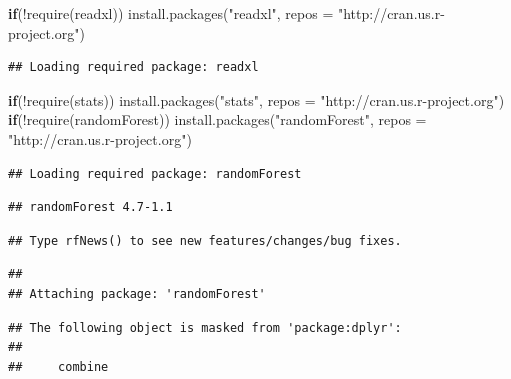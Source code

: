 \documentclass[
]{article}
\newenvironment{Shaded}{}{}
\newcommand{\AttributeTok}[1]{\textcolor[rgb]{0.49,0.56,0.16}{#1}}
\newcommand{\ControlFlowTok}[1]{\textcolor[rgb]{0.00,0.44,0.13}{\textbf{#1}}}
\newcommand{\FunctionTok}[1]{\textcolor[rgb]{0.02,0.16,0.49}{#1}}
\newcommand{\NormalTok}[1]{#1}
\newcommand{\SpecialCharTok}[1]{\textcolor[rgb]{0.25,0.44,0.63}{#1}}
\newcommand{\StringTok}[1]{\textcolor[rgb]{0.25,0.44,0.63}{#1}}
\begin{document}
\begin{Shaded}
\begin{Highlighting}[]
\ControlFlowTok{if}\NormalTok{(}\SpecialCharTok{!}\FunctionTok{require}\NormalTok{(readxl)) }\FunctionTok{install.packages}\NormalTok{(}\StringTok{"readxl"}\NormalTok{, }
                                     \AttributeTok{repos =} \StringTok{"http://cran.us.r{-}project.org"}\NormalTok{)}
\end{Highlighting}
\end{Shaded}

\begin{verbatim}
## Loading required package: readxl
\end{verbatim}

\begin{Shaded}
\begin{Highlighting}[]
\ControlFlowTok{if}\NormalTok{(}\SpecialCharTok{!}\FunctionTok{require}\NormalTok{(stats)) }\FunctionTok{install.packages}\NormalTok{(}\StringTok{"stats"}\NormalTok{, }
                                     \AttributeTok{repos =} \StringTok{"http://cran.us.r{-}project.org"}\NormalTok{)}
\ControlFlowTok{if}\NormalTok{(}\SpecialCharTok{!}\FunctionTok{require}\NormalTok{(randomForest)) }\FunctionTok{install.packages}\NormalTok{(}\StringTok{"randomForest"}\NormalTok{, }
                                     \AttributeTok{repos =} \StringTok{"http://cran.us.r{-}project.org"}\NormalTok{)}
\end{Highlighting}
\end{Shaded}

\begin{verbatim}
## Loading required package: randomForest
\end{verbatim}

\begin{verbatim}
## randomForest 4.7-1.1
\end{verbatim}

\begin{verbatim}
## Type rfNews() to see new features/changes/bug fixes.
\end{verbatim}

\begin{verbatim}
## 
## Attaching package: 'randomForest'
\end{verbatim}

\begin{verbatim}
## The following object is masked from 'package:dplyr':
## 
##     combine
\end{verbatim}
\end{document}
